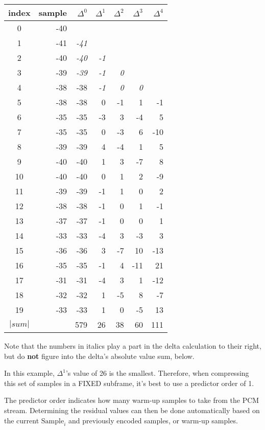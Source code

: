 \begin{table}[h]
\begin{tabular}{|c|r|r|r|r|r|r|}
\hline
index & sample & $\Delta ^ 0$ & $\Delta ^ 1$ & $\Delta ^ 2$ & $\Delta ^ 3$ & $\Delta ^ 4$ \\
\hline
0 & -40 & & & & & \\
1 & -41 & \textit{-41} & & & & \\
2 & -40 & \textit{-40} & \textit{-1} & & & \\
3 & -39 & \textit{-39} & \textit{-1} & \textit{0} & & \\
4 & -38 & -38 & \textit{-1} & \textit{0} & \textit{0} & \\
5 & -38 & -38 & 0 & -1 & 1 & -1 \\
6 & -35 & -35 & -3 & 3 & -4 & 5 \\
7 & -35 & -35 & 0 & -3 & 6 & -10 \\
8 & -39 & -39 & 4 & -4 & 1 & 5 \\
9 & -40 & -40 & 1 & 3 & -7 & 8 \\
10 & -40 & -40 & 0 & 1 & 2 & -9 \\
11 & -39 & -39 & -1 & 1 & 0 & 2 \\
12 & -38 & -38 & -1 & 0 & 1 & -1 \\
13 & -37 & -37 & -1 & 0 & 0 & 1 \\
14 & -33 & -33 & -4 & 3 & -3 & 3 \\
15 & -36 & -36 & 3 & -7 & 10 & -13 \\
16 & -35 & -35 & -1 & 4 & -11 & 21 \\
17 & -31 & -31 & -4 & 3 & 1 & -12 \\
18 & -32 & -32 & 1 & -5 & 8 & -7 \\
19 & -33 & -33 & 1 & 0 & -5 & 13 \\
\hline
$| sum |$ &  & 579 & 26 & 38 & 60 & 111 \\
\hline
\end{tabular}
\end{table}
\par
\noindent
Note that the numbers in italics play a part in the delta
calculation to their right, but do \textbf{not} figure into the
delta's absolute value sum, below.

In this example, $\Delta ^ 1$'s value of 26 is the smallest.
Therefore, when compressing this set of samples in a FIXED subframe,
it's best to use a predictor order of 1.

The predictor order indicates how many warm-up samples to take from
the PCM stream.
Determining the residual values can then be done automatically
based on the current $\text{Sample}_i$ and previously encoded samples, or
warm-up samples.

